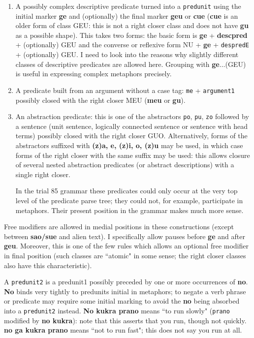 \documentclass[12pt]{book}
\begin{document}
{\begin{enumerate}
\item A possibly complex descriptive predicate turned into a {\tt predunit} using the initial marker {\bf ge} and (optionally) the final marker {\bf geu} or {\bf cue} ({\bf cue} is an older form of class GEU:  this is not a right closer class and does not have {\bf gu} as a possible shape).  This takes two forms:  the basic form is {\bf ge} + {\bf descpred} + (optionally) GEU and
the converse or reflexive form NU + {\bf ge} + {\tt despredE} + (optionally) GEU.  I need to look into the reasons why slightly different classes
of descriptive predicates are allowed here.  Grouping with {\bf ge}$\ldots$(GEU) is useful in expressing complex metaphors precisely.

\item A predicate built from an argument without a case tag:  {\tt me} + {\tt argument1} possibly closed with the right closer MEU ({\bf meu} or {\bf gu}).

\item An abstraction predicate:  this is one of the abstractors {\tt po}, {\tt pu}, {\tt zo} followed by a sentence (unit sentence, logically connected sentence or sentence with head terms) possibly closed with the right closer GUO.  Alternatively, forms of the abstractors suffixed with 
{\bf (z)a, e, (z)i, o, (z)u} may be used, in which case forms of the right closer with the same suffix may be used:  this allows closure of several nested abstraction predicates (or abstract descriptions) with a single right closer.

In the trial 85 grammar these predicates could only occur at the very top level of the predicate parse tree;  they could not, for example, participate in metaphors.   Their present position in the grammar makes much more sense.

\end{enumerate}

Free modifiers are allowed in medial positions in these constructions (except between {\bf sao/sue} and alien text).  I specifically allow pauses before {\bf ge} and after {\bf geu}.  Moreover, this is
one of the few rules which allows an optional free modifier in final position (such classes are ``atomic" in some sense; the right closer classes also have this characteristic).

A {\tt predunit2} is a predunit1 possibly preceded by one or more occurrences of {\bf no}.  {\bf No} binds very tightly to predunits initial in metaphors;  to negate a verb phrase or predicate may require some initial marking to avoid the {\bf no} being absorbed into a {\tt predunit2} instead.  {\bf No kukra prano}
means ``to run slowly" ({\tt prano} modified by {\bf no kukra}):  note that this asserts that you run, though not quickly.  {\bf no ga kukra prano}
means ``not to run fast";  this does not say you run at all.

}
\end{document}
